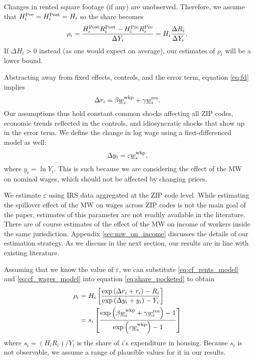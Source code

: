 Changes in rented square footage (if any) are unobserved.
Therefore, we assume that
$H^{\text{Pre}}_i = H^{\text{Post}}_i = H_i$ 
so the share becomes
\begin{equation}\label{eq:share_pocketed}
    \rho_i = \frac{H^{\text{Post}}_i R^{\text{Post}}_i - H^{\text{Pre}}_i R^{\text{Pre}}_i}{\Delta Y_i} = 
                H_i \frac{\Delta R_i}{\Delta Y_i} .
\end{equation}
If $\Delta H_i > 0$ instead (as one would expect on average), 
our estimates of $\rho_i$ will be a lower bound.

Abstracting away from fixed effects, controls, and the error term, 
equation \eqref{eq:fd} implies
\begin{equation}\label{eq:cf_rents_model}
    \Delta r_i = \beta \underline{w}_i^{\text{wkp}} + \gamma \underline{w}_i^{\text{res}} .
\end{equation}
Our assumptions thus hold 
constant common shocks affecting all ZIP codes,
economic trends reflected in the controls, and
idiosyncratic shocks that show up in the error term.
We define the change in log wage using a first-differenced model as well:
\begin{equation}\label{eq:cf_wages_model}
    \Delta y_i = \varepsilon \underline{w}_i^{\text{wkp}} ,
\end{equation}
where $y_i=\ln Y_i$.
This is such because we are considering the effect of the MW on nominal wages,
which should not be affected by changing prices.

We estimate $\varepsilon$ using IRS data aggregated at the ZIP code level.
While estimating the spillover effect of the MW on wages across ZIP codes is 
not the main goal of the paper, 
estimates of this parameter are not readily available in the literature.
There are of course estimates of the effect of the MW on income of workers
inside the same jurisdiction.
Appendix \ref{sec:mw_on_income} discusses the details of our estimation 
strategy.
As we discuss in the next section, our results are in line with existing 
literature.

%
%
%

Assuming that we know the value of $\varepsilon$, we can substitute
\eqref{eq:cf_rents_model} and \eqref{eq:cf_wages_model} into equation
\eqref{eq:share_pocketed} to obtain
\begin{equation}\label{eq:rho}
    \begin{split}
        \rho_i & = H_i \left[ 
        \frac{\exp \left(\Delta r_i + r_i \right) - R_i }
             {\exp \left(\Delta y_i + y_i \right) - Y_i }
        \right] \\
        & = s_i \left[
            \frac{\exp \left( \beta \underline{w}_i^{\text{wkp}} + \gamma \underline{w}_i^{\text{res}} \right) - 1 }
                {\exp \left( \varepsilon \underline{w}_i^{\text{wkp}} \right) - 1 }
            \right]
    \end{split}
\end{equation}
where $s_i = \left(H_i R_i\right)/Y_i$ is the share of $i$'s expenditure in 
housing.
Because $s_i$ is not observable, we assume a range of plausible values for it
in our results.

